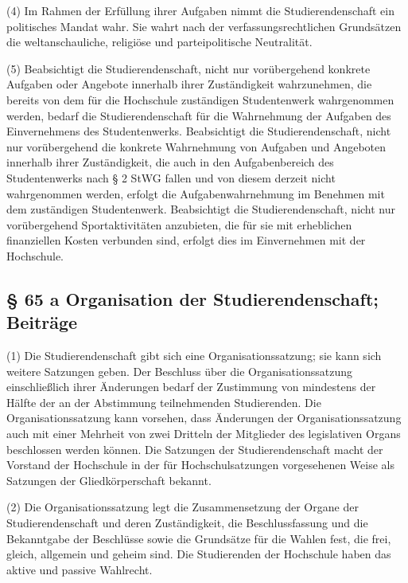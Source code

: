 \documentclass[
10pt,
a4paper,
twoside,								%
titlepage=false,							%
draft=false								%
]{scrartcl}
\begin{document}
(4) Im Rahmen der Erfüllung ihrer Aufgaben nimmt die Studierendenschaft ein politisches Mandat wahr. Sie wahrt nach der verfassungsrechtlichen Grundsätzen die weltanschauliche, religiöse und parteipolitische Neutralität.

(5) Beabsichtigt die Studierendenschaft, nicht nur vorübergehend konkrete Aufgaben oder Angebote innerhalb ihrer Zuständigkeit wahrzunehmen, die bereits von dem für die Hochschule zuständigen Studentenwerk wahrgenommen werden, bedarf die Studierendenschaft für die Wahrnehmung der Aufgaben des Einvernehmens des Studentenwerks. Beabsichtigt die Studierendenschaft, nicht nur vorübergehend die konkrete Wahrnehmung von Aufgaben und Angeboten innerhalb ihrer Zuständigkeit, die auch in den Aufgabenbereich des Studentenwerks nach § 2 StWG fallen und von diesem derzeit nicht wahrgenommen werden, erfolgt die Aufgabenwahrnehmung im Benehmen mit dem zuständigen Studentenwerk. Beabsichtigt die Studierendenschaft, nicht nur vorübergehend Sportaktivitäten anzubieten, die für sie mit erheblichen finanziellen Kosten verbunden sind, erfolgt dies im Einvernehmen mit der Hochschule.


\subsection{§ 65 a Organisation der Studierendenschaft; Beiträge}

(1) Die Studierendenschaft gibt sich eine Organisationssatzung; sie kann sich weitere Satzungen geben. Der Beschluss über die Organisationssatzung einschließlich ihrer Änderungen bedarf der Zustimmung von mindestens der Hälfte der an der Abstimmung teilnehmenden Studierenden. Die Organisationssatzung kann vorsehen, dass Änderungen der Organisationssatzung auch mit einer Mehrheit von zwei Dritteln der Mitglieder des legislativen Organs beschlossen werden können. Die Satzungen der Studierendenschaft macht der Vorstand der Hochschule in der für Hochschulsatzungen vorgesehenen Weise als Satzungen der Gliedkörperschaft bekannt.

(2) Die Organisationssatzung legt die Zusammensetzung der Organe der Studierendenschaft und deren Zuständigkeit, die Beschlussfassung und die Bekanntgabe der Beschlüsse sowie die Grundsätze für die Wahlen fest, die frei, gleich, allgemein und geheim sind. Die Studierenden der Hochschule haben das aktive und passive Wahlrecht.
\end{document}
